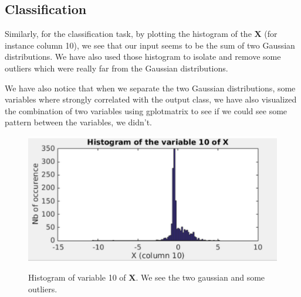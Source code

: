 \documentclass{article} %
\begin{document}
\begin{figure}[!h]
\center
{}
\hfill
{}
\caption{}
\end{figure}

\subsection{Classification}

Similarly, for the classification task, by plotting the histogram of the $\mathbf{X}$ (for instance column 10), we see that our input seems to be the sum of two Gaussian distributions. We have also used those histogram to isolate and remove some outliers which were really far from the Gaussian distributions.

We have also notice that when we separate the two Gaussian distributions, some variables where strongly correlated with the output class, we have also visualized the combination of two variables using gplotmatrix to see if we could see some pattern between the variables, we didn't.

\begin{figure}[!h]
\center
{\includegraphics{figures/histX10.png} \label{fig:histX10}}
\caption{Histogram of variable 10 of $\mathbf{X}$. We see the two gaussian and some outliers.}
\end{figure}
\end{document}
